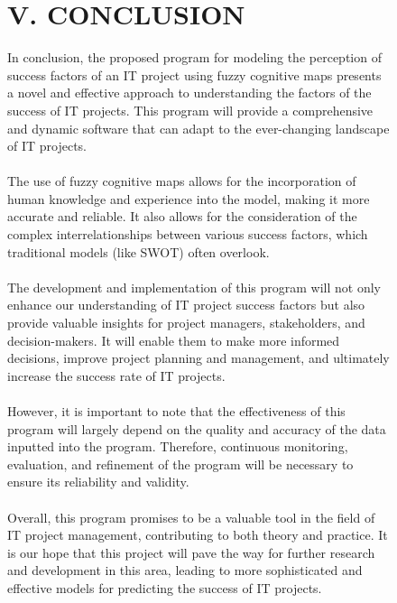 \documentclass{article}
\begin{document}
\begin{figure}[!t]
\begin{minipage}{0.49\textwidth}
\begin{center}
                \chapter{V. CONCLUSION}
            \end{center}
            In conclusion, the proposed program for modeling the perception of success factors of an IT project using fuzzy cognitive maps presents a novel and effective approach to understanding the factors of the success of IT projects. This program will provide a comprehensive and dynamic software that can adapt to the ever-changing landscape of IT projects.\\
            ~\\
            The use of fuzzy cognitive maps allows for the incorporation of human knowledge and experience into the model, making it more accurate and reliable. It also allows for the consideration of the complex interrelationships between various success factors, which traditional models (like SWOT) often overlook.\\
            ~\\
            The development and implementation of this program will not only enhance our understanding of IT project success factors but also provide valuable insights for project managers, stakeholders, and decision-makers. It will enable them to make more informed decisions, improve project planning and management, and ultimately increase the success rate of IT projects.\\
            ~\\
            However, it is important to note that the effectiveness of this program will largely depend on the quality and accuracy of the data inputted into the program. Therefore, continuous monitoring, evaluation, and refinement of the program will be necessary to ensure its reliability and validity.\\
            ~\\
            Overall, this program promises to be a valuable tool in the field of IT project management, contributing to both theory and practice. It is our hope that this project will pave the way for further research and development in this area, leading to more sophisticated and effective models for predicting the success of IT projects.\\
            \begin{center}

\end{center}
\end{minipage}
\end{figure}
\end{document}
